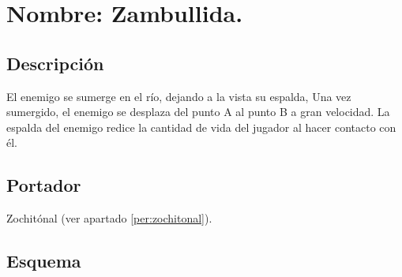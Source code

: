 \section{Nombre: Zambullida.}\label{hab.zambullida}
\subsection{Descripción}
El enemigo se sumerge en el río, dejando a la vista su espalda, Una vez sumergido, el enemigo se desplaza del punto A al punto B a gran velocidad. La espalda del enemigo redice la cantidad de vida del jugador al hacer contacto con él.  
\subsection{Portador}
Zochitónal (ver apartado \ref{per:zochitonal}).
\subsection{Esquema}
		